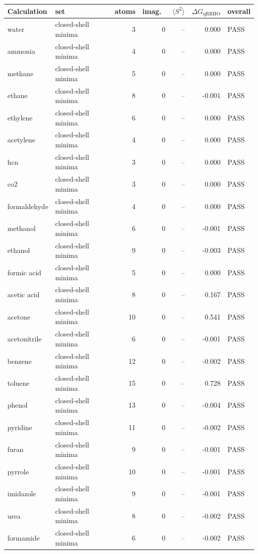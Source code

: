 \begin{tabular}{llrrrrl}
\toprule
Calculation & set & atoms & imag.\ & $\langle S^2\rangle$ & $\Delta G_{\mathrm{qRRHO}}$ & overall \\
\midrule
water & closed-shell minima & 3 & 0 & -- & 0.000 & PASS \\
ammonia & closed-shell minima & 4 & 0 & -- & 0.000 & PASS \\
methane & closed-shell minima & 5 & 0 & -- & 0.000 & PASS \\
ethane & closed-shell minima & 8 & 0 & -- & -0.001 & PASS \\
ethylene & closed-shell minima & 6 & 0 & -- & 0.000 & PASS \\
acetylene & closed-shell minima & 4 & 0 & -- & 0.000 & PASS \\
hcn & closed-shell minima & 3 & 0 & -- & 0.000 & PASS \\
co2 & closed-shell minima & 3 & 0 & -- & 0.000 & PASS \\
formaldehyde & closed-shell minima & 4 & 0 & -- & 0.000 & PASS \\
methanol & closed-shell minima & 6 & 0 & -- & -0.001 & PASS \\
ethanol & closed-shell minima & 9 & 0 & -- & -0.003 & PASS \\
formic acid & closed-shell minima & 5 & 0 & -- & 0.000 & PASS \\
acetic acid & closed-shell minima & 8 & 0 & -- & 0.167 & PASS \\
acetone & closed-shell minima & 10 & 0 & -- & 0.541 & PASS \\
acetonitrile & closed-shell minima & 6 & 0 & -- & -0.001 & PASS \\
benzene & closed-shell minima & 12 & 0 & -- & -0.002 & PASS \\
toluene & closed-shell minima & 15 & 0 & -- & 0.728 & PASS \\
phenol & closed-shell minima & 13 & 0 & -- & -0.004 & PASS \\
pyridine & closed-shell minima & 11 & 0 & -- & -0.002 & PASS \\
furan & closed-shell minima & 9 & 0 & -- & -0.001 & PASS \\
pyrrole & closed-shell minima & 10 & 0 & -- & -0.001 & PASS \\
imidazole & closed-shell minima & 9 & 0 & -- & -0.001 & PASS \\
urea & closed-shell minima & 8 & 0 & -- & -0.002 & PASS \\
formamide & closed-shell minima & 6 & 0 & -- & -0.002 & PASS \\

\end{tabular}
